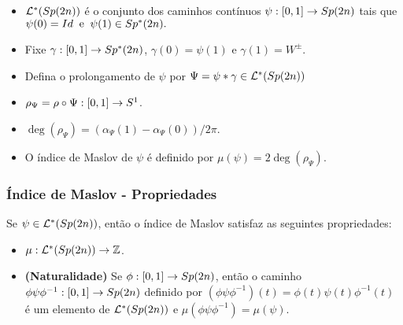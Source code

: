 \documentclass{beamer}
\begin{document}
\begin{footnotesize}
\begin{frame}
\begin{scriptsize}
			
				
			\begin{definicao}
				
				\begin{itemize}
					\item $
					\mathcal{L}^{*}(Sp(2n))$ é o conjunto dos caminhos contínuos $ \psi : [0,1] \to Sp(2n)$ tais que $\psi(0)=Id \;\; \text{e}\;\; \psi(1)\in Sp^{*}(2n).
					$
					
					\item Fixe $\gamma :[0,1] \to Sp^{*}(2n)$, $\gamma(0)=\psi(1)$ e $\gamma(1)=W^{\pm}$. 
					
					\item Defina o prolongamento de $\psi$ por $\Psi = \psi*\gamma \in   \mathcal{L}^{*}(Sp(2n))$ 
					
					\item $\rho_{\Psi} = \rho \circ \Psi:[0,1]\to S^{1}$.
					
					\item $\deg(\rho_{\Psi}) = (\alpha_{\Psi}(1)-\alpha_{\Psi}(0))/2\pi$. 
					
					\item 	O índice de Maslov de $\psi$ é definido por
					$\mu(\psi)= 2\deg(\rho_{\Psi})$.
				\end{itemize}
			\end{definicao}
		\end{scriptsize}
		
		\end{frame}
	
	
	\begin{frame}			
		\frametitle{Índice de Maslov - Propriedades}
		
		\begin{teorema}
			Se $\psi \in \mathcal{L}^{*}(Sp(2n))$, então o índice de Maslov satisfaz as seguintes propriedades:
			\begin{itemize}
				\item $\mu:\mathcal{L}^{*}(Sp(2n)) \to \mathbb{Z}$.
				
				\item \textbf{(Naturalidade)}\label{item_naturalidade_maslov} Se $\phi:[0,1]
				\to Sp(2n)$, então o caminho $\phi\psi\phi^{-1}: [0,1] \to Sp(2n)$ definido por $(\phi\psi\phi^{-1})(t) = \phi(t)\psi(t)\phi^{-1}(t)$ é um elemento de $\mathcal{L}^{*}(Sp(2n))$ e $\mu(\phi\psi\phi^{-1}) = \mu(\psi)$.
				

\end{itemize}
\end{teorema}
\end{frame}
\end{footnotesize}
\end{document}
